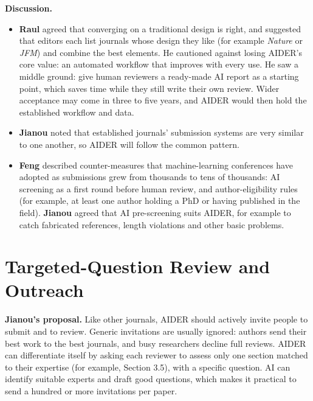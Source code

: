 \documentclass[11pt]{article}
\begin{document}
\textbf{Discussion.}
\begin{itemize}
  \item \textbf{Raul} agreed that converging on a traditional design is right, and suggested that editors each list journals whose design they like (for example \emph{Nature} or \emph{JFM}) and combine the best elements. He cautioned against losing AIDER's core value: an automated workflow that improves with every use. He saw a middle ground: give human reviewers a ready-made AI report as a starting point, which saves time while they still write their own review. Wider acceptance may come in three to five years, and AIDER would then hold the established workflow and data.
  \item \textbf{Jianou} noted that established journals' submission systems are very similar to one another, so AIDER will follow the common pattern.
  \item \textbf{Feng} described counter-measures that machine-learning conferences have adopted as submissions grew from thousands to tens of thousands: AI screening as a first round before human review, and author-eligibility rules (for example, at least one author holding a PhD or having published in the field). \textbf{Jianou} agreed that AI pre-screening suits AIDER, for example to catch fabricated references, length violations and other basic problems.
\end{itemize}

\section{Targeted-Question Review and Outreach}

\textbf{Jianou's proposal.} Like other journals, AIDER should actively invite people to submit and to review. Generic invitations are usually ignored: authors send their best work to the best journals, and busy researchers decline full reviews. AIDER can differentiate itself by asking each reviewer to assess only one section matched to their expertise (for example, Section 3.5), with a specific question. AI can identify suitable experts and draft good questions, which makes it practical to send a hundred or more invitations per paper.
\end{document}
